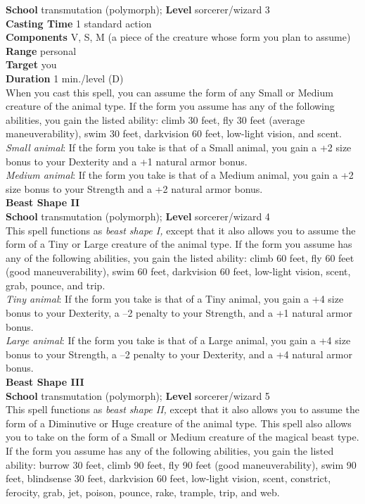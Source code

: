 \textbf{School }transmutation (polymorph); \textbf{Level }sorcerer/wizard 3\\
\textbf{Casting Time }1 standard action\\
\textbf{Components }V, S, M (a piece of the creature whose form you plan to assume)\\
\textbf{Range }personal\\
\textbf{Target }you\\
\textbf{Duration }1 min./level (D)\\
When you cast this spell, you can assume the form of any Small or Medium creature of the animal type. If the form you assume has any of the following abilities, you gain the listed ability: climb 30 feet, fly 30 feet (average maneuverability), swim 30 feet, darkvision 60 feet, low-light vision, and scent.\\
\textit{Small animal}: If the form you take is that of a Small animal, you gain a +2 size bonus to your Dexterity and a +1 natural armor bonus.\\
\textit{Medium animal}: If the form you take is that of a Medium animal, you gain a +2 size bonus to your Strength and a +2 natural armor bonus.\\
\textbf{Beast Shape II}\\
\textbf{School} transmutation (polymorph); \textbf{Level} sorcerer/wizard 4\\
This spell functions as \textit{beast shape I,} except that it also allows you to assume the form of a Tiny or Large creature of the animal type. If the form you assume has any of the following abilities, you gain the listed ability: climb 60 feet, fly 60 feet (good maneuverability), swim 60 feet, darkvision 60 feet, low-light vision, scent, grab, pounce, and trip.\\
\textit{Tiny animal}: If the form you take is that of a Tiny animal, you gain a +4 size bonus to your Dexterity, a –2 penalty to your Strength, and a +1 natural armor bonus.\\
\textit{Large animal}: If the form you take is that of a Large animal, you gain a +4 size bonus to your Strength, a –2 penalty to your Dexterity, and a +4 natural armor bonus.\\
\textbf{Beast Shape III}\\
\textbf{School }transmutation (polymorph); \textbf{Level }sorcerer/wizard 5\\
This spell functions as \textit{beast shape II, }except that it also allows you to assume the form of a Diminutive or Huge creature of the animal type. This spell also allows you to take on the form of a Small or Medium creature of the magical beast type. If the form you assume has any of the following abilities, you gain the listed ability: burrow 30 feet, climb 90 feet, fly 90 feet (good maneuverability), swim 90 feet, blindsense 30 feet, darkvision 60 feet, low-light vision, scent, constrict, ferocity, grab, jet, poison, pounce, rake, trample, trip, and web.\\
